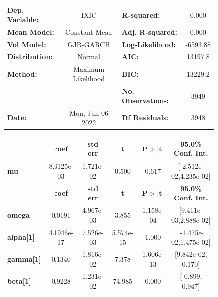 \documentclass[a4paper, oneside]{discothesis}
\begin{document}
\begin{figure}
\begin{multicols}{2}
{  
\begin{center}
\begin{tabular}{lclc}
\toprule
\textbf{Dep. Variable:} &        IXIC        & \textbf{  R-squared:         } &     0.000   \\
\textbf{Mean Model:}    &   Constant Mean    & \textbf{  Adj. R-squared:    } &     0.000   \\
\textbf{Vol Model:}     &     GJR-GARCH      & \textbf{  Log-Likelihood:    } &   -6593.88  \\
\textbf{Distribution:}  &       Normal       & \textbf{  AIC:               } &    13197.8  \\
\textbf{Method:}        & Maximum Likelihood & \textbf{  BIC:               } &    13229.2  \\
\textbf{}               &                    & \textbf{  No. Observations:  } &    3949     \\
\textbf{Date:}          &  Mon, Jun 06 2022  & \textbf{  Df Residuals:      } &    3948     \\
\bottomrule
\end{tabular}
\begin{tabular}{lccccc}
            & \textbf{coef} & \textbf{std err} & \textbf{t} & \textbf{P$> |$t$|$} & \textbf{95.0\% Conf. Int.}  \\
\midrule
\textbf{mu} &   8.6125e-03  &    1.721e-02     &     0.500  &          0.617       &   [-2.512e-02,4.235e-02]    \\
                  & \textbf{coef} & \textbf{std err} & \textbf{t} & \textbf{P$> |$t$|$} & \textbf{95.0\% Conf. Int.}  \\
\midrule
\textbf{omega}    &       0.0191  &    4.967e-03     &     3.855  &      1.158e-04       &   [9.411e-03,2.888e-02]     \\
\textbf{alpha[1]} &   4.1946e-17  &    7.526e-03     & 5.574e-15  &          1.000       &   [-1.475e-02,1.475e-02]    \\
\textbf{gamma[1]} &       0.1340  &    1.816e-02     &     7.378  &      1.606e-13       &    [9.842e-02,  0.170]      \\
\textbf{beta[1]}  &       0.9228  &    1.231e-02     &    74.985  &        0.000         &     [  0.899,  0.947]       \\
\bottomrule
\end{tabular}
\end{center}

}
\end{multicols}
\end{figure}
\end{document}
